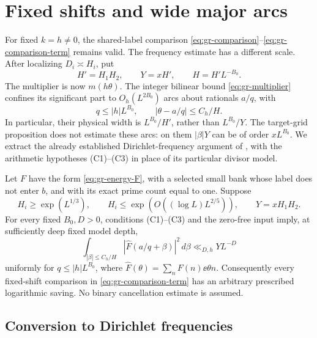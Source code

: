 \section{Fixed shifts and wide major arcs}\label{sec:fixed-shift-comparison}

For fixed \(k=h\ne0\), the shared-label comparison
\eqref{eq:gr-comparison}--\eqref{eq:gr-comparison-term} remains valid.
The frequency estimate has a different scale. After localizing
\(D_i\asymp H_i\), put
\[
 H'=H_1H_2,\qquad Y=xH',\qquad H=H'L^{-B_0}.
\]
The multiplier is now \(m(h\theta)\). The integer bilinear bound
\eqref{eq:gr-multiplier} confines its significant part to
\(O_h(L^{2B_0})\) arcs about rationals \(a/q\), with
\[
 q\le |h|L^{B_0},\qquad
       |\theta-a/q|\le C_h/H.
\]
In particular, their physical width is \(L^{B_0}/H'\), rather than
\(L^{B_0}/Y\). The target-grid proposition does not estimate these
arcs: on them \(|\beta|Y\) can be of order \(xL^{B_0}\).
We extract the already established Dirichlet-frequency argument of
\cite[Sections 6.2--6.4]{walsh}, with the arithmetic hypotheses
\textup{(C1)--(C3)} in place of its particular divisor model.

\begin{proposition}
\label{prop:fixed-comparison-energy}
Let \(F\) have the form \eqref{eq:gr-energy-F}, with a selected
small bank whose label does not enter \(b\), and with its exact
prime count equal to one. Suppose
\[
 H_i\ge\exp(L^{1/3}),\qquad
 H_i\le\exp(O((\log L)L^{2/5})),\qquad Y=xH_1H_2.
\]
For every fixed \(B_0,D>0\), conditions \textup{(C1)--(C3)} and
the zero-free input imply, at sufficiently deep fixed model depth,
\begin{equation}\label{eq:fixed-wide-energy}
 \int_{|\beta|\le C_h/H}
      |\widehat F(a/q+\beta)|^2\,d\beta
                            \ll_{D,h}YL^{-D}
\end{equation}
uniformly for \(q\le |h|L^{B_0}\), where
\(\widehat F(\theta)=\sum_nF(n)\ee{\theta n}\).
Consequently every fixed-shift comparison in
\eqref{eq:gr-comparison-term} has an arbitrary prescribed
logarithmic saving. No binary cancellation estimate is assumed.
\end{proposition}

\subsection{Conversion to Dirichlet frequencies}

